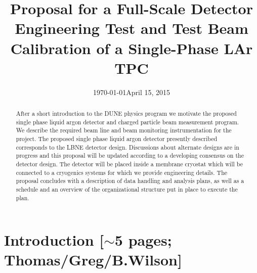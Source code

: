 \documentclass[12pt]{article}
\begin{document}
\linenumbers

\title{  Proposal for a Full-Scale Detector Engineering Test and Test Beam Calibration of a Single-Phase LAr TPC}

\date{\today}
\date{April 15, 2015}
	

\maketitle




\begin{abstract}

After a short introduction to the DUNE physics program we motivate the proposed single phase liquid argon detector and charged particle beam measurement program. 
We describe the required beam line and beam monitoring instrumentation for the project.
The proposed single phase liquid argon detector presently described corresponds to the LBNE detector design. Discussions about alternate designs are in progress and this proposal will be updated according to a developing consensus on the detector design. The detector will be placed inside a membrane cryostat which will be connected to a cryogenics systems for which we provide engineering details. The proposal concludes with a description of data handling and analysis plans, as well as a schedule and an overview of the organizational structure put in place to execute the plan.



\end{abstract}

\newpage
\tableofcontents

\newpage

\section{Introduction [$\sim$5 pages; {\color{red} Thomas/Greg/B.Wilson}]}
	
%	

\end{document}
